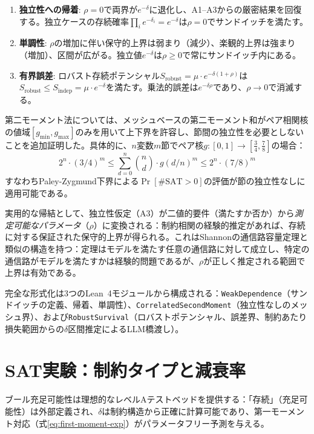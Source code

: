 \documentclass[11pt,a4paper]{article}
\begin{document}
\begin{enumerate}
\item \textbf{独立性への帰着}: $\rho = 0$で両界が$e^{-\delta}$に退化し、A1--A3からの厳密結果を回復する。独立ケースの存続確率$\prod_i e^{-\delta_i} = e^{-\delta}$は$\rho = 0$でサンドイッチを満たす。

\item \textbf{単調性}: $\rho$の増加に伴い保守的上界は弱まり（減少）、楽観的上界は強まり（増加）、区間が広がる。独立値$e^{-\delta}$は$\rho \geq 0$で常にサンドイッチ内にある。

\item \textbf{有界誤差}: ロバスト存続ポテンシャル$S_{\text{robust}} = \mu \cdot e^{-\delta(1+\rho)}$は$S_{\text{robust}} \leq S_{\text{indep}} = \mu \cdot e^{-\delta}$を満たす。乗法的誤差は$e^{-\delta\rho}$であり、$\rho \to 0$で消滅する。
\end{enumerate}

第二モーメント法については、メッシュベースの第二モーメント和がペア相関核の値域$[g_{\min}, g_{\max}]$のみを用いて上下界を許容し、節間の独立性を必要としないことを追加証明した。具体的に、$n$変数$m$節でペア核$g: [0,1] \to [\tfrac{3}{4}, \tfrac{7}{8}]$の場合：
\[
2^n \cdot (3/4)^m \leq \sum_{d=0}^{n} \binom{n}{d} \cdot g(d/n)^m \leq 2^n \cdot (7/8)^m
\]
すなわちPaley-Zygmund下界による$\Pr[\#\text{SAT} > 0]$の評価が節の独立性なしに適用可能である。

実用的な帰結として、独立性仮定（A3）が二値的要件（満たすか否か）から\emph{測定可能なパラメータ}（$\rho$）に変換される：制約相関の経験的推定があれば、存続に対する保証された保守的上界が得られる。これはShannonの通信路容量定理と類似の構造を持つ：定理はモデルを満たす任意の通信路に対して成立し、特定の通信路がモデルを満たすかは経験的問題であるが、$\rho$が正しく推定される範囲で上界は有効である。

完全な形式化は3つのLean~4モジュールから構成される：\texttt{WeakDependence}（サンドイッチの定義、帰着、単調性）、\texttt{CorrelatedSecondMoment}（独立性なしのメッシュ界）、および\texttt{RobustSurvival}（ロバストポテンシャル、誤差界、制約あたり損失範囲からの$\delta$区間推定によるLLM橋渡し）。

\section{SAT実験：制約タイプと減衰率}
\label{sec:sat}

ブール充足可能性は理想的なレベルAテストベッドを提供する：「存続」（充足可能性）は外部定義され、$\delta$は制約構造から正確に計算可能であり、第一モーメント対応（式\ref{eq:first-moment-exp}）がパラメータフリー予測を与える。
\end{document}
